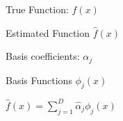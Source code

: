 \documentclass{article}
\begin{document}
True Function: $f(x)$

Estimated Function $\hat{f}(x)$

Basis coefficients: $\alpha_j$

Basis Functions $\phi_j(x)$

$\hat{f}(x) = \sum_{j=1}^D \hat{\alpha}_j \phi_j(x)$
\end{document}
